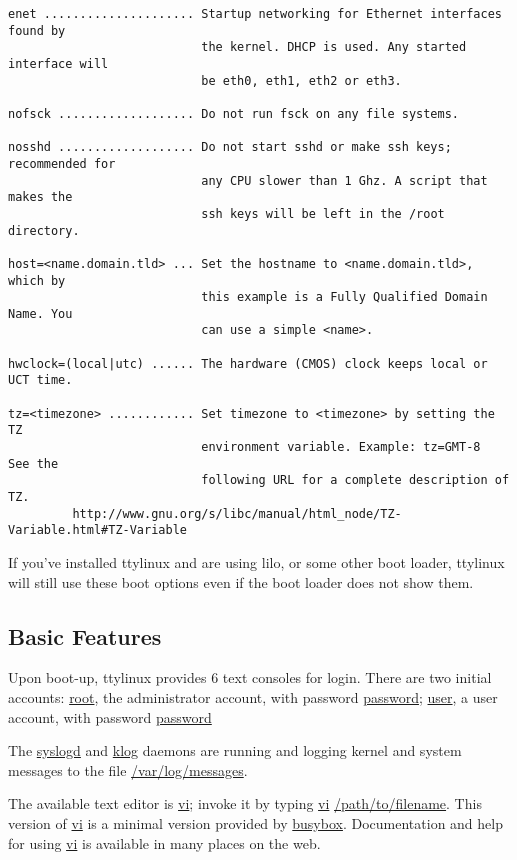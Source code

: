 \documentclass[10pt]{article}
\begin{document}
\begin{lstlisting}
enet ..................... Startup networking for Ethernet interfaces found by
                           the kernel. DHCP is used. Any started interface will
                           be eth0, eth1, eth2 or eth3.

nofsck ................... Do not run fsck on any file systems.

nosshd ................... Do not start sshd or make ssh keys; recommended for
                           any CPU slower than 1 Ghz. A script that makes the
                           ssh keys will be left in the /root directory.

host=<name.domain.tld> ... Set the hostname to <name.domain.tld>, which by
                           this example is a Fully Qualified Domain Name. You
                           can use a simple <name>.

hwclock=(local|utc) ...... The hardware (CMOS) clock keeps local or UCT time.

tz=<timezone> ............ Set timezone to <timezone> by setting the TZ
                           environment variable. Example: tz=GMT-8  See the
                           following URL for a complete description of TZ.
         http://www.gnu.org/s/libc/manual/html_node/TZ-Variable.html#TZ-Variable
\end{lstlisting}

If you've installed ttylinux and are using lilo, or some other boot loader,
ttylinux will still use these boot options even if the boot loader does not
show them.

\subsection{Basic Features}

Upon boot-up, ttylinux provides 6 text consoles for login. There are two
initial accounts: \url{root}, the administrator account, with password
\url{password}; \url{user}, a user account, with password \url{password}

The \url{syslogd} and \url{klog} daemons are running and logging kernel and
system messages to the file \url{/var/log/messages}.

The available text editor is \url{vi}; invoke it by typing \url{vi}
\url{/path/to/filename}. This version of \url{vi} is a minimal version provided
by \url{busybox}. Documentation and help for using \url{vi} is available in
many places on the web.
\end{document}

